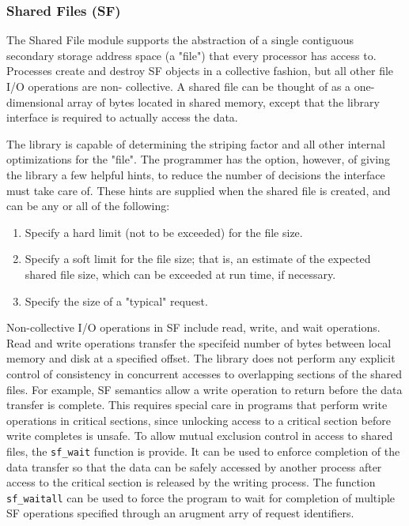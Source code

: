 \subsubsection{Shared Files (SF)}

The Shared File module supports the abstraction of a single contiguous  secondary storage
address space (a "file") that every processor has access to.  Processes create and 
destroy SF objects in a collective fashion, but all other file I/O operations are non-
collective.  A shared file can be thought of as a one-dimensional array of bytes located 
in shared memory, except that the library interface is required to actually access the
data.

The library is capable of determining the striping factor and all other internal
optimizations for the "file".  The programmer has the option, however, of giving the library a few
helpful hints, to reduce the number of decisions the interface must take care of.  These hints
are supplied when the shared file is created, and can be any or all of the following:

\begin{enumerate}
\item Specify a hard limit (not to be exceeded) for the file size.
\item Specify a soft limit for the file size; that is, an estimate of the expected
shared file size, which can be exceeded at run time, if necessary.
\item Specify the size of a "typical" request.
\end{enumerate}

Non-collective I/O operations in SF include read, write, and wait operations.  Read and write 
operations transfer the specifeid number of bytes between local memory and disk at a
specified offset.  The library does not perform any explicit control of consistency
in concurrent accesses to overlapping sections of the shared files.  For example, SF
semantics allow a write operation to return before the data transfer is complete.
This requires special care in programs that perform write operations in critical  sections,
since unlocking access to a critical section before write completes is unsafe.
To allow mutual exclusion control in access to shared files, the {\tt sf\_wait} function
is provide.  It can be used
to enforce completion of the data transfer so that the data can be safely accessed
by another process after access to the critical section is released by the writing
process.  The function {\tt sf\_waitall} can be used to force the program to wait for completion
of multiple SF operations specified through an arugment arry of request identifiers.

